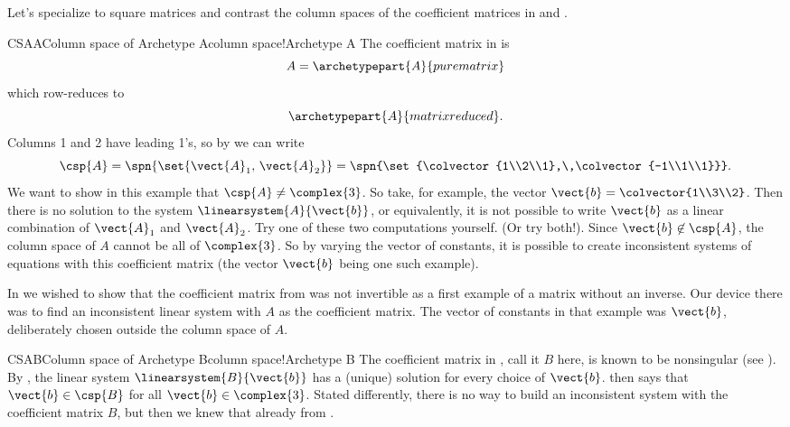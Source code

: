 %
%
Let's specialize to square matrices and contrast the column spaces of the coefficient matrices in  and .
%
\begin{example}{CSAA}{Column space of Archetype A}{column space!Archetype A}
%
The coefficient matrix in  is
%
\begin{equation*}
A=\archetypepart{A}{purematrix}
\end{equation*}
%
which row-reduces to
%
\begin{equation*}
\archetypepart{A}{matrixreduced}.
\end{equation*}
%
Columns 1 and 2 have leading 1's, so by  we can write
%
\begin{equation*}
\csp{A}=\spn{\set{\vect{A}_1,\,\vect{A}_2}}=\spn{\set{\colvector{1\\2\\1},\,\colvector{-1\\1\\1}}}.
\end{equation*}
%
We want to show in this example that $\csp{A}\neq\complex{3}$.  So take, for example, the vector $\vect{b}=\colvector{1\\3\\2}$.  Then there is no solution to the system $\linearsystem{A}{\vect{b}}$, or equivalently, it is not possible to write $\vect{b}$ as a linear combination of $\vect{A}_1$ and $\vect{A}_2$.  Try  one of these two computations yourself.  (Or try both!).  Since $\vect{b}\not\in\csp{A}$, the column space of $A$ cannot be all of $\complex{3}$.  So by varying the vector of constants, it is possible to create inconsistent systems of equations with this coefficient matrix (the vector $\vect{b}$ being one such example).\par
%
In  we wished to show that the coefficient matrix from  was not invertible as a first example of a matrix without an inverse.  Our device there was to find an inconsistent linear system with $A$ as the coefficient matrix.  The vector of constants in that example was $\vect{b}$, deliberately chosen outside the column space of $A$.
%
\end{example}
%
%
\begin{example}{CSAB}{Column space of Archetype B}{column space!Archetype B}
%
The coefficient matrix in , call it $B$ here,  is known to be nonsingular (see ).  By , the linear system $\linearsystem{B}{\vect{b}}$ has a (unique) solution for every choice of $\vect{b}$.   then says that $\vect{b}\in\csp{B}$ for all $\vect{b}\in\complex{3}$.  Stated differently, there is no way to build an inconsistent system with the coefficient matrix $B$, but then we knew that already from .
%
\end{example}
